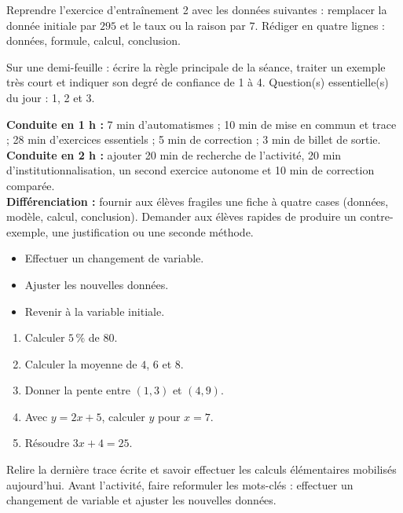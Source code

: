 \begin{dm}Reprendre l'exercice d'entraînement 2 avec les données suivantes : remplacer la donnée initiale par $295$ et le taux ou la raison par $7$. Rédiger en quatre lignes : données, formule, calcul, conclusion.\end{dm}

\begin{sortie}Sur une demi-feuille : écrire la règle principale de la séance, traiter un exemple très court et indiquer son degré de confiance de 1 à 4. Question(s) essentielle(s) du jour : 1, 2 et 3.\end{sortie}

\ifprof
\begin{methode}
\textbf{Conduite en 1 h :} 7 min d'automatismes ; 10 min de mise en commun et trace ; 28 min d'exercices essentiels ; 5 min de correction ; 3 min de billet de sortie.\\
\textbf{Conduite en 2 h :} ajouter 20 min de recherche de l'activité, 20 min d'institutionnalisation, un second exercice autonome et 10 min de correction comparée.\\
\textbf{Différenciation :} fournir aux élèves fragiles une fiche à quatre cases (données, modèle, calcul, conclusion). Demander aux élèves rapides de produire un contre-exemple, une justification ou une seconde méthode.
\end{methode}
\fi
{}
\begin{objectifs}\begin{itemize}\item Effectuer un changement de variable.\item Ajuster les nouvelles données.\item Revenir à la variable initiale.\end{itemize}\end{objectifs}
\begin{automatismes}\begin{enumerate}\item Calculer $5\,\%$ de $80$. \item Calculer la moyenne de $4$, $6$ et $8$. \item Donner la pente entre $(1,3)$ et $(4,9)$. \item Avec $y=2x+5$, calculer $y$ pour $x=7$. \item Résoudre $3x+4=25$. \end{enumerate}\end{automatismes}
\begin{prerequis}Relire la dernière trace écrite et savoir effectuer les calculs élémentaires mobilisés aujourd'hui. Avant l'activité, faire reformuler les mots-clés : effectuer un changement de variable et ajuster les nouvelles données.\end{prerequis}

